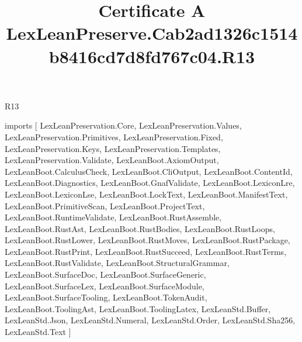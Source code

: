 \begin{lexlean}{R13}
\title{Certificate A LexLeanPreserve.Cab2ad1326c1514b8416cd7d8fd767c04.R13}
\begin{coremodule}
imports [
  LexLeanPreservation.Core,
  LexLeanPreservation.Values,
  LexLeanPreservation.Primitives,
  LexLeanPreservation.Fixed,
  LexLeanPreservation.Keys,
  LexLeanPreservation.Templates,
  LexLeanPreservation.Validate,
  LexLeanBoot.AxiomOutput,
  LexLeanBoot.CalculusCheck,
  LexLeanBoot.CliOutput,
  LexLeanBoot.ContentId,
  LexLeanBoot.Diagnostics,
  LexLeanBoot.GnafValidate,
  LexLeanBoot.LexiconLre,
  LexLeanBoot.LexiconLse,
  LexLeanBoot.LockText,
  LexLeanBoot.ManifestText,
  LexLeanBoot.PrimitiveScan,
  LexLeanBoot.ProjectText,
  LexLeanBoot.RuntimeValidate,
  LexLeanBoot.RustAssemble,
  LexLeanBoot.RustAst,
  LexLeanBoot.RustBodies,
  LexLeanBoot.RustLoops,
  LexLeanBoot.RustLower,
  LexLeanBoot.RustMoves,
  LexLeanBoot.RustPackage,
  LexLeanBoot.RustPrint,
  LexLeanBoot.RustSucceed,
  LexLeanBoot.RustTerms,
  LexLeanBoot.RustValidate,
  LexLeanBoot.StructuralGrammar,
  LexLeanBoot.SurfaceDoc,
  LexLeanBoot.SurfaceGeneric,
  LexLeanBoot.SurfaceLex,
  LexLeanBoot.SurfaceModule,
  LexLeanBoot.SurfaceTooling,
  LexLeanBoot.TokenAudit,
  LexLeanBoot.ToolingAst,
  LexLeanBoot.ToolingLatex,
  LexLeanStd.Buffer,
  LexLeanStd.Json,
  LexLeanStd.Numeral,
  LexLeanStd.Order,
  LexLeanStd.Sha256,
  LexLeanStd.Text
]


\end{coremodule}
\end{lexlean}
